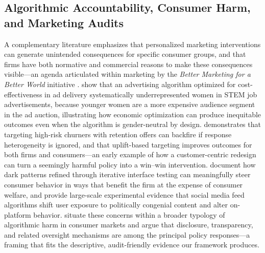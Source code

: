 \documentclass[11pt,letterpaper,english]{article}
\theoremstyle{definition}
\theoremstyle{definition}
\begin{document}
\begin{bibunit}
\subsection{Algorithmic Accountability, Consumer Harm, and Marketing Audits}
\label{sec:lit-fairness}

A complementary literature emphasizes that personalized marketing interventions can generate unintended consequences for specific consumer groups, and that firms have both normative and commercial reasons to make these consequences visible---an agenda articulated within marketing by the \emph{Better Marketing for a Better World} initiative \citep{chandy2021better}. \citet{lambrecht2019algorithmic} show that an advertising algorithm optimized for cost-effectiveness in ad delivery systematically underrepresented women in STEM job advertisements, because younger women are a more expensive audience segment in the ad auction, illustrating how economic optimization can produce inequitable outcomes even when the algorithm is gender-neutral by design. \citet{ascarza2018retention} demonstrates that targeting high-risk churners with retention offers can backfire if response heterogeneity is ignored, and that uplift-based targeting improves outcomes for both firms and consumers---an early example of how a customer-centric redesign can turn a seemingly harmful policy into a win--win intervention. \citet{luguri2021shining} document how dark patterns refined through iterative interface testing can meaningfully steer consumer behavior in ways that benefit the firm at the expense of consumer welfare, and \citet{guess2023social} provide large-scale experimental evidence that social media feed algorithms shift user exposure to politically congenial content and alter on-platform behavior. \citet{bar2023algorithmic} situate these concerns within a broader typology of algorithmic harm in consumer markets and argue that disclosure, transparency, and related oversight mechanisms are among the principal policy responses---a framing that fits the descriptive, audit-friendly evidence our framework produces.


\end{bibunit}
\end{document}
